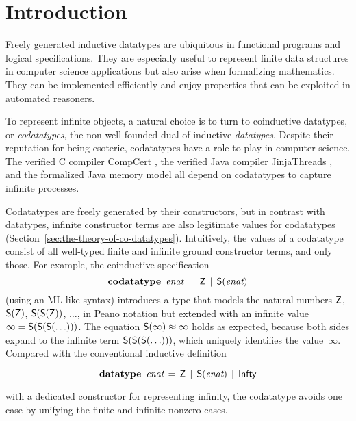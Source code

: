 \begin{nomemoriam}
\smallskipamount
\end{nomemoriam}

\setcounter{footnote}{0}

\section{Introduction}
\label{sec:introduction}

Freely generated inductive datatypes are ubiquitous in functional programs and
logical specifications. They are especially
useful to represent finite data structures in computer science applications but
also arise when formalizing mathematics.
They can be implemented efficiently and enjoy
properties that can be exploited in automated reasoners.
%

To represent infinite objects, %
a natural choice is to turn to coinductive datatypes, or \emph{codatatypes},
the non-well-founded dual of inductive \emph{datatypes}.
%
Despite their reputation for being esoteric, codatatypes have a
role to play in computer science. The verified C compiler CompCert
\cite{leroy-2009}, the verified Java compiler Jinja\-Threads
\cite{lochbihler-2010-jinja}, and the formalized Java memory model
\cite{lochbihler-2014-jmm} all depend on codatatypes to capture infinite
processes.

Codatatypes are freely generated by their constructors, but in contrast with datatypes,
infinit\-e constructor terms are also legitimate values for codatatypes
(Section~\ref{sec:the-theory-of-co-datatypes}). Intuitively, the
values of a codatatype consist of all well-typed finite and infinite ground
constructor
terms, and only those. For example, the coinductive specification
%
\[\textbf{codatatype}~\,\textit{enat} \,=\, \textsf{Z} \,\mid\, \textsf{S}(\textit{enat})\]
%
(using an ML-like syntax) introduces a type that
models the natural numbers $\textsf{Z}$, $\textsf{S}(\textsf{Z})$, $\textsf{S}(\textsf{S}(\textsf{Z}))$, $\ldots$\afterLdots{},
in Peano notation but extended with an
infinite value $\infty = \textsf{S}(\textsf{S}(\textsf{S}(\ldots)))$.
The equation $\textsf{S}(\infty) \approx \infty$ holds as expected,
because both sides expand to the infinite term
$\textsf{S}(\textsf{S}(\textsf{S}(\ldots)))$, which uniquely identifies the
value~$\infty$.
Compared with the conventional inductive definition
\begin{rep}
\[\textbf{datatype}~\,\textit{enat} \,=\, \textsf{Z} \,\mid\, \textsf{S}(\textit{enat}) \,\mid\, \textsf{Infty}\]
\end{rep}
with a dedicated constructor for representing infinity, the codatatype avoids
one case by unifying the finite and infinite nonzero cases.

